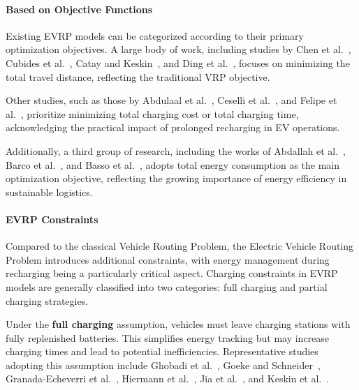 \paragraph{Based on Objective Functions}

Existing EVRP models can be categorized according to their primary optimization objectives.  
A large body of work, including studies by Chen et al.~\cite{chen2016electric}, Cubides et al.~\cite{cubides2019electric}, Catay and Keskin~\cite{ccatay2017impact}, and Ding et al.~\cite{ding2015conflict}, focuses on minimizing the total travel distance, reflecting the traditional VRP objective.

Other studies, such as those by Abdulaal et al.~\cite{abdulaal2016solving}, Ceselli et al.~\cite{ceselli2021branch}, and Felipe et al.~\cite{felipe2014heuristic}, prioritize minimizing total charging cost or total charging time, acknowledging the practical impact of prolonged recharging in EV operations.

Additionally, a third group of research, including the works of Abdallah et al.~\cite{abdallah2020electric}, Barco et al.~\cite{barco2017optimal}, and Basso et al.~\cite{basso2019energy, basso2021electric}, adopts total energy consumption as the main optimization objective, reflecting the growing importance of energy efficiency in sustainable logistics.

\paragraph{EVRP Constraints}

Compared to the classical Vehicle Routing Problem, the Electric Vehicle Routing Problem introduces additional constraints, with energy management during recharging being a particularly critical aspect.  
Charging constraints in EVRP models are generally classified into two categories: full charging and partial charging strategies.

Under the \textbf{full charging} assumption, vehicles must leave charging stations with fully replenished batteries.  
This simplifies energy tracking but may increase charging times and lead to potential inefficiencies.  
Representative studies adopting this assumption include Ghobadi et al.~\cite{ghobadi2021multi}, Goeke and Schneider~\cite{goeke2015routing}, Granada-Echeverri et al.~\cite{granada2020electric}, Hiermann et al.~\cite{hiermann2016electric}, Jia et al.~\cite{jia2021bilevel}, and Keskin et al.~\cite{keskin2016partial}.

